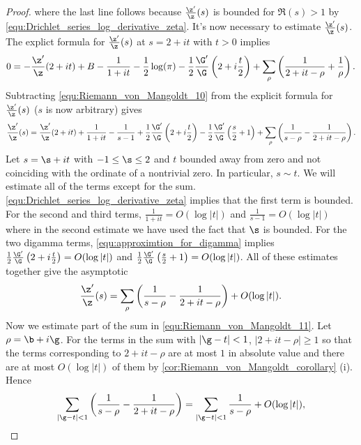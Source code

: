 \begin{proof}
        where the last line follows because $\frac{\z'}{\z}(s)$ is bounded for $\Re(s) > 1$ by \cref{equ:Drichlet_series_log_derivative_zeta}. It's now necessary to estimate $\frac{\z'}{\z}(s)$. The explict formula for $\frac{\z'}{\z}(s)$ at $s = 2+it$ with $t > 0$ implies
        \begin{equation}\label{equ:Riemann_von_Mangoldt_10}
          0 = -\frac{\z'}{\z}(2+it)+B-\frac{1}{1+it}-\frac{1}{2}\log(\pi)-\frac{1}{2}\frac{\G'}{\G}\left(2+i\frac{t}{2}\right)+\sum_{\rho}\left(\frac{1}{2+it-\rho}+\frac{1}{\rho}\right).
        \end{equation}
        Subtracting \cref{equ:Riemann_von_Mangoldt_10} from the explicit formula for $\frac{\z'}{\z}(s)$ ($s$ is now arbitrary) gives
        \[
          \frac{\z'}{\z}(s) = \frac{\z'}{\z}(2+it)+\frac{1}{1+it}-\frac{1}{s-1}+\frac{1}{2}\frac{\G'}{\G}\left(2+i\frac{t}{2}\right)-\frac{1}{2}\frac{\G'}{\G}\left(\frac{s}{2}+1\right)+\sum_{\rho}\left(\frac{1}{s-\rho}-\frac{1}{2+it-\rho}\right).
        \]
        Let $s = \s+it$ with $-1 \le \s \le 2$ and $t$ bounded away from zero and not coinciding with the ordinate of a nontrivial zero. In particular, $s \sim t$. We will estimate all of the terms except for the sum. \cref{equ:Drichlet_series_log_derivative_zeta} implies that the first term is bounded. For the second and third terms, $\frac{1}{1+it} = O(\log|t|)$ and $\frac{1}{s-1} = O(\log|t|)$ where in the second estimate we have used the fact that $\s$ is bounded. For the two digamma terms, \cref{equ:approximtion_for_digamma} implies $\frac{1}{2}\frac{\G'}{\G}\left(2+i\frac{t}{2}\right) = O(\log|t|)$ and $\frac{1}{2}\frac{\G'}{\G}\left(\frac{s}{2}+1\right) = O(\log|t|)$. All of these estimates together give the asymptotic
        \begin{equation}\label{equ:Riemann_von_Mangoldt_11}
          \frac{\z'}{\z}(s) = \sum_{\rho}\left(\frac{1}{s-\rho}-\frac{1}{2+it-\rho}\right)+O(\log|t|).
        \end{equation}
        Now we estimate part of the sum in \cref{equ:Riemann_von_Mangoldt_11}. Let $\rho = \b+i\g$. For the terms in the sum with $|\g-t| < 1$, $|2+it-\rho| \ge 1$ so that the terms corresponding to $2+it-\rho$ are at most $1$ in absolute value and there are at most $O(\log|t|)$ of them by \cref{cor:Riemann_von_Mangoldt_corollary} (i). Hence
        \begin{equation}\label{equ:Riemann_von_Mangoldt_12}
          \sum_{|\g-t| < 1}\left(\frac{1}{s-\rho}-\frac{1}{2+it-\rho}\right) = \sum_{|\g-t| < 1}\frac{1}{s-\rho}+O(\log|t|),
        \end{equation}

\end{proof}
